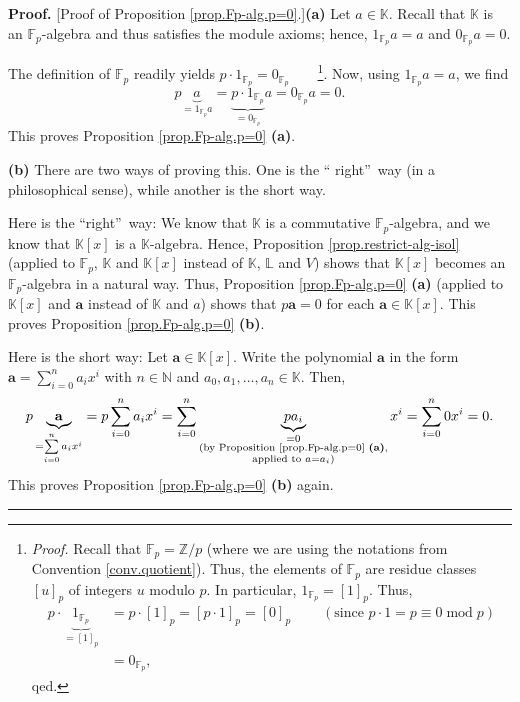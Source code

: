 \documentclass[numbers=enddot,12pt,final,onecolumn,notitlepage]{scrartcl}%
\theoremstyle{definition}
\newenvironment{proof}[1][Proof]{\noindent\textbf{#1.} }{\ \rule{0.5em}{0.5em}}
\let\sumnonlimits\sum
\renewcommand{\sum}{\sumnonlimits\limits}
\begin{document}
\begin{proof}
[Proof of Proposition \ref{prop.Fp-alg.p=0}.]\textbf{(a)} Let $a\in\mathbb{K}%
$. Recall that $\mathbb{K}$ is an $\mathbb{F}_{p}$-algebra and thus satisfies
the module axioms; hence, $1_{\mathbb{F}_{p}}a=a$ and $0_{\mathbb{F}_{p}}a=0$.

The definition of $\mathbb{F}_{p}$ readily yields $p\cdot1_{\mathbb{F}_{p}%
}=0_{\mathbb{F}_{p}}$\ \ \ \ \footnote{\textit{Proof.} Recall that
$\mathbb{F}_{p}=\mathbb{Z}/p$ (where we are using the notations from
Convention \ref{conv.quotient}). Thus, the elements of $\mathbb{F}_{p}$ are
residue classes $\left[  u\right]  _{p}$ of integers $u$ modulo $p$. In
particular, $1_{\mathbb{F}_{p}}=\left[  1\right]  _{p}$. Thus,
\begin{align*}
p\cdot\underbrace{1_{\mathbb{F}_{p}}}_{=\left[  1\right]  _{p}}  &
=p\cdot\left[  1\right]  _{p}=\left[  p\cdot1\right]  _{p}=\left[  0\right]
_{p}\ \ \ \ \ \ \ \ \ \ \left(  \text{since }p\cdot1=p\equiv
0\operatorname{mod}p\right) \\
&  =0_{\mathbb{F}_{p}},
\end{align*}
qed.}. Now, using $1_{\mathbb{F}_{p}}a=a$, we find%
\[
p\underbrace{a}_{=1_{\mathbb{F}_{p}}a}=\underbrace{p\cdot1_{\mathbb{F}_{p}}%
}_{=0_{\mathbb{F}_{p}}}a=0_{\mathbb{F}_{p}}a=0.
\]
This proves Proposition \ref{prop.Fp-alg.p=0} \textbf{(a)}.

\textbf{(b)} There are two ways of proving this. One is the \textquotedblleft
right\textquotedblright\ way (in a philosophical sense), while another is the
short way.

Here is the \textquotedblleft right\textquotedblright\ way: We know that
$\mathbb{K}$ is a commutative $\mathbb{F}_{p}$-algebra, and we know that
$\mathbb{K}\left[  x\right]  $ is a $\mathbb{K}$-algebra. Hence, Proposition
\ref{prop.restrict-alg-isol} (applied to $\mathbb{F}_{p}$, $\mathbb{K}$ and
$\mathbb{K}\left[  x\right]  $ instead of $\mathbb{K}$, $\mathbb{L}$ and $V$)
shows that $\mathbb{K}\left[  x\right]  $ becomes an $\mathbb{F}_{p}$-algebra
in a natural way. Thus, Proposition \ref{prop.Fp-alg.p=0} \textbf{(a)}
(applied to $\mathbb{K}\left[  x\right]  $ and $\mathbf{a}$ instead of
$\mathbb{K}$ and $a$) shows that $p\mathbf{a}=0$ for each $\mathbf{a}%
\in\mathbb{K}\left[  x\right]  $. This proves Proposition
\ref{prop.Fp-alg.p=0} \textbf{(b)}.

Here is the short way: Let $\mathbf{a}\in\mathbb{K}\left[  x\right]  $. Write
the polynomial $\mathbf{a}$ in the form $\mathbf{a}=\sum_{i=0}^{n}a_{i}x^{i}$
with $n\in\mathbb{N}$ and $a_{0},a_{1},\ldots,a_{n}\in\mathbb{K}$. Then,
\[
p\underbrace{\mathbf{a}}_{=\sum_{i=0}^{n}a_{i}x^{i}}=p\sum_{i=0}^{n}a_{i}%
x^{i}=\sum_{i=0}^{n}\underbrace{pa_{i}}_{\substack{=0\\\text{(by Proposition
\ref{prop.Fp-alg.p=0} \textbf{(a)},}\\\text{applied to }a=a_{i}\text{)}}%
}x^{i}=\sum_{i=0}^{n}0x^{i}=0.
\]
This proves Proposition \ref{prop.Fp-alg.p=0} \textbf{(b)} again.
\end{proof}
\end{document}
